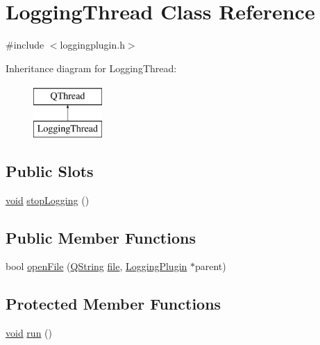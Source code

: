 \hypertarget{class_logging_thread}{\section{Logging\-Thread Class Reference}
\label{class_logging_thread}
}


{\ttfamily \#include $<$loggingplugin.\-h$>$}

Inheritance diagram for Logging\-Thread\-:\begin{figure}[H]
\begin{center}
\leavevmode
\includegraphics[height=2.000000cm]{class_logging_thread}
\end{center}
\end{figure}
\subsection*{Public Slots}
\begin{DoxyCompactItemize}
\item 
\hyperlink{group___u_a_v_objects_plugin_ga444cf2ff3f0ecbe028adce838d373f5c}{void} \hyperlink{group___logging_ga5eba425f2187c79f32c9a7b8187c4de4}{stop\-Logging} ()
\end{DoxyCompactItemize}
\subsection*{Public Member Functions}
\begin{DoxyCompactItemize}
\item 
bool \hyperlink{group___logging_gabd55e7242d33b800b73a8ff3fc56deb5}{open\-File} (\hyperlink{group___u_a_v_objects_plugin_gab9d252f49c333c94a72f97ce3105a32d}{Q\-String} \hyperlink{uavobjecttemplate_8m_a97c04efa65bcf0928abf9260bc5cbf46}{file}, \hyperlink{class_logging_plugin}{Logging\-Plugin} $\ast$parent)
\end{DoxyCompactItemize}
\subsection*{Protected Member Functions}
\begin{DoxyCompactItemize}
\item 
\hyperlink{group___u_a_v_objects_plugin_ga444cf2ff3f0ecbe028adce838d373f5c}{void} \hyperlink{group___logging_ga1efde5dc8009a1f63a5ab9a52f9c3749}{run} ()
\end{DoxyCompactItemize}
